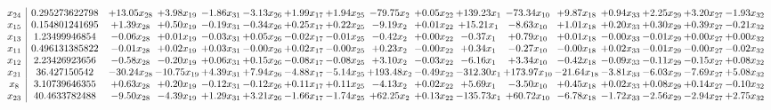 \documentclass[9pt]{article}
\begin{document}
 \[\begin{array}{c| c c@{\hskip 2pt} c@{\hskip 2pt} c@{\hskip 2pt} c@{\hskip 2pt} c@{\hskip 2pt} c@{\hskip 2pt} c@{\hskip 2pt} c@{\hskip 2pt} c@{\hskip 2pt} c@{\hskip 2pt} c@{\hskip 2pt} c@{\hskip 2pt} c@{\hskip 2pt} c@{\hskip 2pt} c@{\hskip 2pt} }
 x_{24}   &  0.295273622798 & + 13.05 x_{28} & +  3.98 x_{19} & -1.86 x_{31} & -3.13 x_{26} & +  1.99 x_{17} & +  1.94 x_{25} & -79.75 x_{2} & +  0.05 x_{22} & + 139.23 x_{1} & -73.34 x_{10} & +  9.87 x_{18} & +  0.94 x_{33} & +  2.25 x_{29} & +  3.20 x_{27} & -1.93 x_{32}\\
 x_{15}   &  0.154801241695 & +  1.39 x_{28} & +  0.50 x_{19} & -0.19 x_{31} & -0.34 x_{26} & +  0.25 x_{17} & +  0.22 x_{25} & -9.19 x_{2} & +  0.01 x_{22} & + 15.21 x_{1} & -8.63 x_{10} & +  1.01 x_{18} & +  0.20 x_{33} & +  0.30 x_{29} & +  0.39 x_{27} & -0.21 x_{32}\\
 x_{13}   &  1.23499946854 & -0.06 x_{28} & +  0.01 x_{19} & -0.03 x_{31} & +  0.05 x_{26} & -0.02 x_{17} & -0.01 x_{25} & -0.42 x_{2} & +  0.00 x_{22} & -0.37 x_{1} & +  0.79 x_{10} & +  0.01 x_{18} & -0.00 x_{33} & -0.01 x_{29} & +  0.00 x_{27} & +  0.00 x_{32}\\
 x_{11}   &  0.496131385822 & -0.01 x_{28} & +  0.02 x_{19} & +  0.03 x_{31} & -0.00 x_{26} & +  0.02 x_{17} & -0.00 x_{25} & +  0.23 x_{2} & -0.00 x_{22} & +  0.34 x_{1} & -0.27 x_{10} & -0.00 x_{18} & +  0.02 x_{33} & -0.01 x_{29} & -0.00 x_{27} & -0.02 x_{32}\\
 x_{12}   &  2.23426923656 & -0.58 x_{28} & -0.20 x_{19} & +  0.06 x_{31} & +  0.15 x_{26} & -0.08 x_{17} & -0.08 x_{25} & +  3.10 x_{2} & -0.03 x_{22} & -6.16 x_{1} & +  3.34 x_{10} & -0.42 x_{18} & -0.09 x_{33} & -0.11 x_{29} & -0.15 x_{27} & +  0.08 x_{32}\\
 x_{21}   &  36.427150542 & -30.24 x_{28} & -10.75 x_{19} & +  4.39 x_{31} & +  7.94 x_{26} & -4.88 x_{17} & -5.14 x_{25} & + 193.48 x_{2} & -0.49 x_{22} & -312.30 x_{1} & + 173.97 x_{10} & -21.64 x_{18} & -3.81 x_{33} & -6.03 x_{29} & -7.69 x_{27} & +  5.08 x_{32}\\
 x_{8}   &  3.10739646355 & +  0.63 x_{28} & +  0.20 x_{19} & -0.12 x_{31} & -0.12 x_{26} & +  0.11 x_{17} & +  0.11 x_{25} & -4.13 x_{2} & +  0.02 x_{22} & +  5.69 x_{1} & -3.50 x_{10} & +  0.45 x_{18} & +  0.02 x_{33} & +  0.08 x_{29} & +  0.14 x_{27} & -0.10 x_{32}\\
 x_{23}   &  40.4633782488 & -9.50 x_{28} & -4.39 x_{19} & +  1.29 x_{31} & +  3.21 x_{26} & -1.66 x_{17} & -1.74 x_{25} & + 62.25 x_{2} & +  0.13 x_{22} & -135.73 x_{1} & + 60.72 x_{10} & -6.78 x_{18} & -1.72 x_{33} & -2.56 x_{29} & -2.94 x_{27} & +  2.75 x_{32}\\

\end{array}\]
\end{document}
